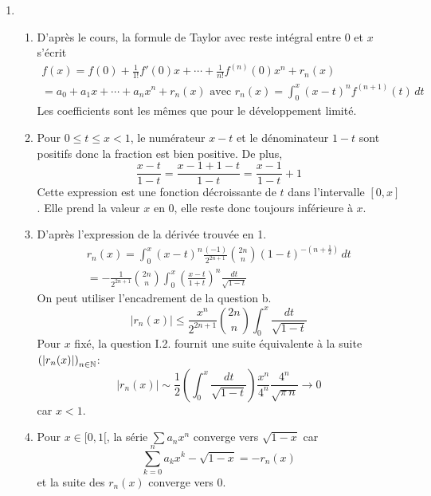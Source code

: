 \begin{enumerate}
  \item
\begin{enumerate}
  \item D'après le cours, la formule de Taylor avec reste intégral entre $0$ et $x$ s'écrit
\begin{multline*}
f(x) = f(0) + \frac{1}{1!}f'(0)x + \cdots + \frac{1}{n!}f^{(n)}(0)x^n + r_n(x) \\
= a_0 + a_1x + \cdots + a_nx^n + r_n(x)
\text{ avec }
r_n(x) = \int_{0}^{x}(x-t)^n f^{(n+1)}(t)\,dt
\end{multline*}
Les coefficients sont les mêmes que pour le développement limité.

  \item Pour $0\leq t \leq x <1$, le numérateur $x-t$ et le dénominateur $1-t$ sont positifs donc la fraction est bien positive. De plus,
\begin{displaymath}
\frac{x-t}{1-t} = \frac{x-1 +1 - t}{1-t} = \frac{x-1}{1-t} +1   
\end{displaymath}
Cette expression est une fonction décroissante de $t$ dans l'intervalle $[0,x]$. Elle prend la valeur $x$ en $0$, elle reste donc toujours inférieure à $x$.

  \item D'après l'expression de la dérivée trouvée en 1.
\begin{multline*}
  r_n(x)=
\int_0^{x}(x-t)^n\frac{(-1)}{2^{2n+1}}\binom{2n}{n}(1-t)^{-(n+\frac{1}{2})}\, dt\\
= -\frac{1}{2^{2n+1}}\binom{2n}{n}\int_0^x \left(\frac{x-t}{1+t} \right)^n \frac{dt}{\sqrt{1-t}} 
\end{multline*}
On peut utiliser l'encadrement de la question b.
\begin{displaymath}
|r_n(x)|\leq \frac{x^n}{2^{2n+1}}\binom{2n}{n}\int_0^x \frac{dt}{\sqrt{1-t}}
\end{displaymath}
Pour $x$ fixé, la question I.2. fournit une suite équivalente à la suite $\left( |r_n(x)|\right)_{n\in \mathbb{N}}$:
\begin{displaymath}
|r_n(x)| \sim \frac{1}{2} \left( \int_0^x \frac{dt}{\sqrt{1-t}}\right)  \frac{x^n}{4^{n}} \frac{4^n}{\sqrt{\pi\,n}} \longrightarrow 0
\end{displaymath}
car $x<1$.
  
  \item Pour $x\in [0,1[$, la série $\sum a_nx^n$ converge vers $\sqrt{1-x}$ car 
\begin{displaymath}
  \sum_{k=0}^na_kx^k - \sqrt{1-x} = -r_n(x)
\end{displaymath}
et la suite des $r_n(x)$ converge vers $0$.
\end{enumerate}


\end{enumerate}
